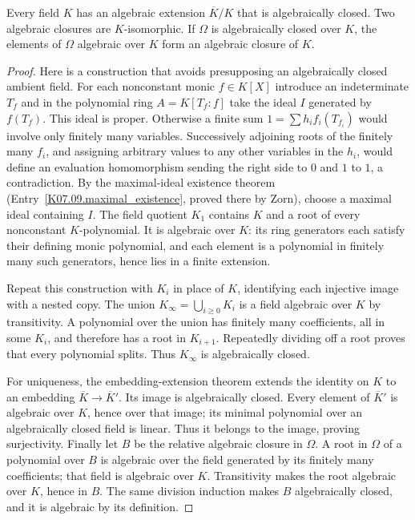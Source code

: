 \begin{theorem}
Every field $K$ has an algebraic extension $\overline K/K$ that is algebraically closed. Two algebraic closures are $K$-isomorphic. If $\Omega$ is algebraically closed over $K$, the elements of $\Omega$ algebraic over $K$ form an algebraic closure of $K$.
\end{theorem}
\begin{proof}
Here is a construction that avoids presupposing an algebraically closed ambient field. For each nonconstant monic $f\in K[X]$ introduce an indeterminate $T_f$ and in the polynomial ring $A=K[T_f:f]$ take the ideal $I$ generated by $f(T_f)$. This ideal is proper. Otherwise a finite sum $1=\sum h_i f_i(T_{f_i})$ would involve only finitely many variables. Successively adjoining roots of the finitely many $f_i$, and assigning arbitrary values to any other variables in the $h_i$, would define an evaluation homomorphism sending the right side to $0$ and $1$ to $1$, a contradiction. By the maximal-ideal existence theorem (Entry~\ref{K07.09.maximal_existence}, proved there by Zorn), choose a maximal ideal containing $I$. The field quotient $K_1$ contains $K$ and a root of every nonconstant $K$-polynomial. It is algebraic over $K$: its ring generators each satisfy their defining monic polynomial, and each element is a polynomial in finitely many such generators, hence lies in a finite extension.

Repeat this construction with $K_i$ in place of $K$, identifying each injective image with a nested copy. The union $K_\infty=\bigcup_{i\geq0}K_i$ is a field algebraic over $K$ by transitivity. A polynomial over the union has finitely many coefficients, all in some $K_i$, and therefore has a root in $K_{i+1}$. Repeatedly dividing off a root proves that every polynomial splits. Thus $K_\infty$ is algebraically closed.

For uniqueness, the embedding-extension theorem extends the identity on $K$ to an embedding $\overline K\to\overline K'$. Its image is algebraically closed. Every element of $\overline K'$ is algebraic over $K$, hence over that image; its minimal polynomial over an algebraically closed field is linear. Thus it belongs to the image, proving surjectivity. Finally let $B$ be the relative algebraic closure in $\Omega$. A root in $\Omega$ of a polynomial over $B$ is algebraic over the field generated by its finitely many coefficients; that field is algebraic over $K$. Transitivity makes the root algebraic over $K$, hence in $B$. The same division induction makes $B$ algebraically closed, and it is algebraic by its definition.
\end{proof}

